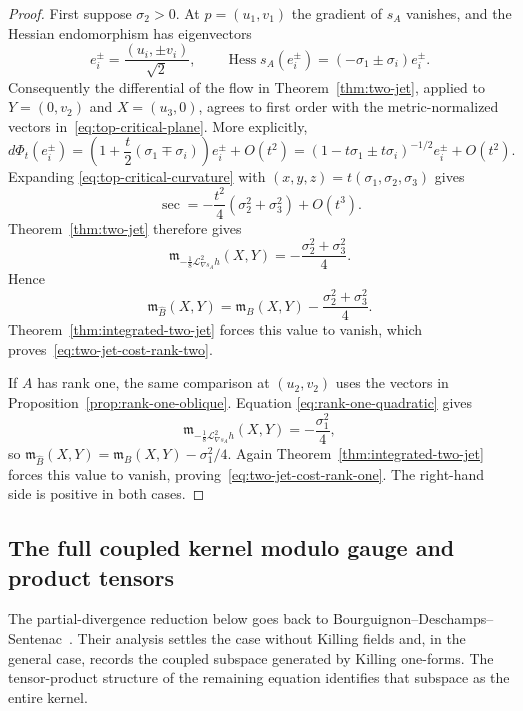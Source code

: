 \documentclass[11pt]{amsart}
\theoremstyle{definition}
\theoremstyle{remark}
\DeclareMathOperator{\Hess}{Hess}
\DeclareMathOperator{\secop}{sec}
\begin{document}
\begin{proof}
First suppose $\sigma_2>0$.  At $p=(u_1,v_1)$ the gradient of $s_A$
vanishes, and the Hessian endomorphism has eigenvectors
\[
 e_i^\pm=\frac{(u_i,\pm v_i)}{\sqrt2},
 \qquad
 \Hess s_A(e_i^\pm)=(-\sigma_1\pm\sigma_i)e_i^\pm.
\]
Consequently the differential of the flow in
Theorem~\ref{thm:two-jet}, applied to $Y=(0,v_2)$ and $X=(u_3,0)$,
agrees to first order with the metric-normalized vectors
in~\eqref{eq:top-critical-plane}.  More explicitly,
\[
 d\Phi_t(e_i^\pm)
 =\left(1+\frac t2(\sigma_1\mp\sigma_i)\right)e_i^\pm+O(t^2)
 =(1-t\sigma_1\pm t\sigma_i)^{-1/2}e_i^\pm+O(t^2).
\]
Expanding
\eqref{eq:top-critical-curvature} with
$(x,y,z)=t(\sigma_1,\sigma_2,\sigma_3)$ gives
\begin{equation}\label{eq:top-critical-two-jet}
 \secop=-\frac{t^2}{4}(\sigma_2^2+\sigma_3^2)+O(t^3).
\end{equation}
Theorem~\ref{thm:two-jet} therefore gives
\[
 \mathfrak m_{-\frac18\mathcal L_{\nabla s_A}^2h}(X,Y)
 =-\frac{\sigma_2^2+\sigma_3^2}{4}.
\]
Hence
\[
 \mathfrak m_{\widehat B}(X,Y)
 =\mathfrak m_B(X,Y)-\frac{\sigma_2^2+\sigma_3^2}{4}.
\]
Theorem~\ref{thm:integrated-two-jet} forces this value to vanish,
which proves~\eqref{eq:two-jet-cost-rank-two}.

If $A$ has rank one, the same comparison at $(u_2,v_2)$ uses the
vectors in Proposition~\ref{prop:rank-one-oblique}.  Equation
\eqref{eq:rank-one-quadratic} gives
\[
 \mathfrak m_{-\frac18\mathcal L_{\nabla s_A}^2h}(X,Y)
 =-\frac{\sigma_1^2}{4},
\]
so $\mathfrak m_{\widehat B}(X,Y)
=\mathfrak m_B(X,Y)-\sigma_1^2/4$.  Again
Theorem~\ref{thm:integrated-two-jet} forces this value to vanish,
proving~\eqref{eq:two-jet-cost-rank-one}.  The right-hand side is
positive in both cases.
\end{proof}

\subsection{The full coupled kernel modulo gauge and product tensors}

The partial-divergence reduction below goes back to
Bourguignon--Deschamps--Sentenac~\cite{BourguignonDeschampsSentenac1972}.
Their analysis settles the case without Killing fields and, in the general
case, records the coupled subspace generated by Killing one-forms.  The
tensor-product structure of the remaining equation identifies that subspace
as the entire kernel.
\end{document}
